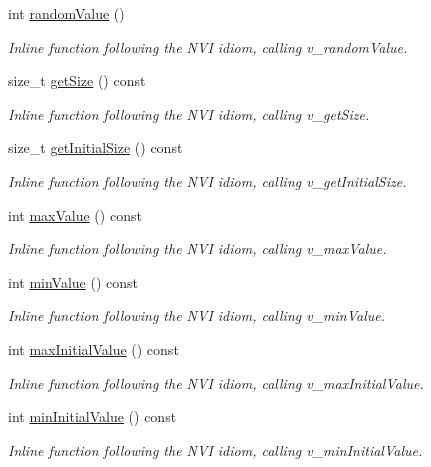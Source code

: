 \begin{DoxyCompactItemize}
int \hyperlink{classghost_1_1Domain_ae2ab236c8382d3f541d0f4db44d2b625}{random\-Value} ()
\begin{DoxyCompactList}\small\item\em Inline function following the N\-V\-I idiom, calling v\-\_\-random\-Value. \end{DoxyCompactList}\item 
size\-\_\-t \hyperlink{classghost_1_1Domain_ac84d289fcf22d1d67e545389e7a9de84}{get\-Size} () const 
\begin{DoxyCompactList}\small\item\em Inline function following the N\-V\-I idiom, calling v\-\_\-get\-Size. \end{DoxyCompactList}\item 
size\-\_\-t \hyperlink{classghost_1_1Domain_a4ecdf5fbb8fb13e3b4c74f51aecf38f5}{get\-Initial\-Size} () const 
\begin{DoxyCompactList}\small\item\em Inline function following the N\-V\-I idiom, calling v\-\_\-get\-Initial\-Size. \end{DoxyCompactList}\item 
int \hyperlink{classghost_1_1Domain_a1c62e66fb56efc0586e81cc8ea203dc7}{max\-Value} () const 
\begin{DoxyCompactList}\small\item\em Inline function following the N\-V\-I idiom, calling v\-\_\-max\-Value. \end{DoxyCompactList}\item 
int \hyperlink{classghost_1_1Domain_a3c407e59963930f82c17b04d784df0f6}{min\-Value} () const 
\begin{DoxyCompactList}\small\item\em Inline function following the N\-V\-I idiom, calling v\-\_\-min\-Value. \end{DoxyCompactList}\item 
int \hyperlink{classghost_1_1Domain_ac05fdbbd6124f557fd4806efedd0fc83}{max\-Initial\-Value} () const 
\begin{DoxyCompactList}\small\item\em Inline function following the N\-V\-I idiom, calling v\-\_\-max\-Initial\-Value. \end{DoxyCompactList}\item 
int \hyperlink{classghost_1_1Domain_a82507f2d7e9077e7bd00b88c5ff99c5f}{min\-Initial\-Value} () const 
\begin{DoxyCompactList}\small\item\em Inline function following the N\-V\-I idiom, calling v\-\_\-min\-Initial\-Value. \end{DoxyCompactList}\item 

\end{DoxyCompactItemize}
